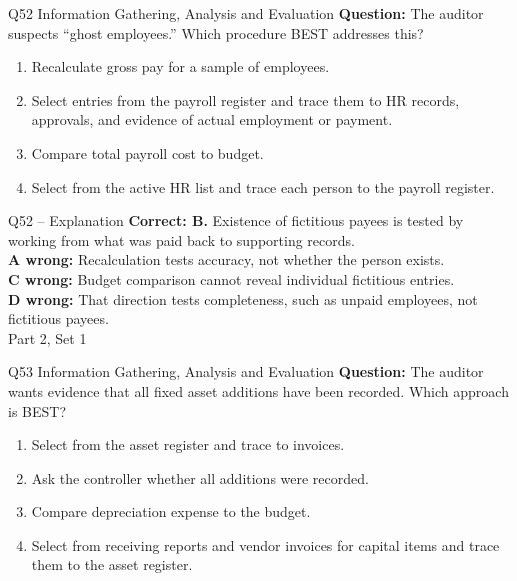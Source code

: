 \documentclass[aspectratio=169,10pt]{beamer}
\begin{document}
\begin{frame}[t]{Q52 \hfill {\scriptsize Information Gathering, Analysis and Evaluation}}
	\small
	\textbf{Question:} The auditor suspects ``ghost employees.'' Which procedure BEST addresses this?
	\begin{enumerate}[label=\Alph*.,itemsep=1pt,topsep=3pt]
			\item Recalculate gross pay for a sample of employees.
			\item Select entries from the payroll register and trace them to HR records, approvals, and evidence of actual employment or payment.
			\item Compare total payroll cost to budget.
			\item Select from the active HR list and trace each person to the payroll register.
	\end{enumerate}
\end{frame}
\begin{frame}[t]{Q52 -- Explanation}
	\footnotesize
	\textbf{Correct: B.} Existence of fictitious payees is tested by working from what was paid back to supporting records. \\[5pt]
\textbf{A wrong:} Recalculation tests accuracy, not whether the person exists. \\[3pt]
\textbf{C wrong:} Budget comparison cannot reveal individual fictitious entries. \\[3pt]
\textbf{D wrong:} That direction tests completeness, such as unpaid employees, not fictitious payees. \\[3pt]
	\vfill {\tiny Part 2, Set 1}
\end{frame}
\begin{frame}[t]{Q53 \hfill {\scriptsize Information Gathering, Analysis and Evaluation}}
	\small
	\textbf{Question:} The auditor wants evidence that all fixed asset additions have been recorded. Which approach is BEST?
	\begin{enumerate}[label=\Alph*.,itemsep=1pt,topsep=3pt]
			\item Select from the asset register and trace to invoices.
			\item Ask the controller whether all additions were recorded.
			\item Compare depreciation expense to the budget.
			\item Select from receiving reports and vendor invoices for capital items and trace them to the asset register.
	\end{enumerate}
\end{frame}
\end{document}
